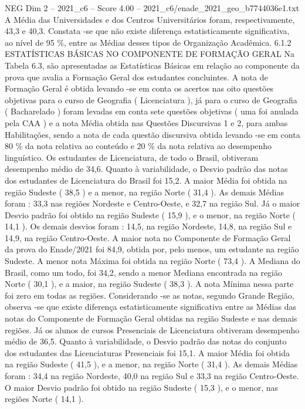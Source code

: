 \begin{textsample}{NEG Dim 2 – 2021\_c6 – Score 4.00 – 2021\_c6/enade\_2021\_geo\_b7744036e1.txt}
A Média das Universidades e dos Centros Universitários foram, respectivamente, 43,3 e 40,3.
Constata -se que não existe diferença estatisticamente significativa, ao nível de 95 \%, entre as Médias desses tipos de Organização Acadêmica. 6.1.2 ESTATÍSTICAS BÁSICAS NO COMPONENTE DE FORMAÇÃO GERAL Na Tabela 6.3, são apresentadas as Estatísticas Básicas em relação ao componente da prova que avalia a Formação Geral dos estudantes concluintes.
A nota de Formação Geral é obtida levando -se em conta os acertos nas oito questões objetivas para o curso de Geografia ( Licenciatura ), já para o curso de Geografia ( Bacharelado ) foram levadas em conta sete questões objetivas ( uma foi anulada pela CAA ) e a nota Média obtida nas Questões Discursivas 1 e 2, para ambas Habilitações, sendo a nota de cada questão discursiva obtida levando -se em conta 80 \% da nota relativa ao conteúdo e 20 \% da nota relativa ao desempenho linguístico.
Os estudantes de Licenciatura, de todo o Brasil, obtiveram desempenho médio de 34,6.
Quanto à variabilidade, o Desvio padrão das notas dos estudantes de Licenciatura do Brasil foi 15,2.
A maior Média foi obtida na região Sudeste ( 38,5 ) e a menor, na região Norte ( 31,4 ).
As demais Médias foram : 33,3 nas regiões Nordeste e Centro-Oeste, e 32,7 na região Sul.
Já o maior Desvio padrão foi obtido na região Sudeste ( 15,9 ), e o menor, na região Norte ( 14,1 ).
Os demais desvios foram : 14,5, na região Nordeste, 14,8, na região Sul e 14,9, na região Centro-Oeste.
A maior nota no Componente de Formação Geral da prova do Enade/2021 foi 84,9, obtida por, pelo menos, um estudante na região Sudeste.
A menor nota Máxima foi obtida na região Norte ( 73,4 ).
A Mediana do Brasil, como um todo, foi 34,2, sendo a menor Mediana encontrada na região Norte ( 30,1 ), e a maior, na região Sudeste ( 38,3 ).
A nota Mínima nessa parte foi zero em todas as regiões.
Considerando -se as notas, segundo Grande Região, observa -se que existe diferença estatisticamente significativa entre as Médias das notas do Componente de Formação Geral obtidas na região Sudeste e nas demais regiões.
Já os alunos de cursos Presenciais de Licenciatura obtiveram desempenho médio de 36,5.
Quanto à variabilidade, o Desvio padrão das notas do conjunto dos estudantes das Licenciaturas Presenciais foi 15,1.
A maior Média foi obtida na região Sudeste ( 41,5 ), e a menor, na região Norte ( 31,4 ).
As demais Médias foram : 34,4 na região Nordeste, 40,0 na região Sul e 33,3 na região Centro-Oeste.
O maior Desvio padrão foi obtido na região Sudeste ( 15,3 ), e o menor, nas regiões Norte ( 14,1 ).

\end{textsample}
